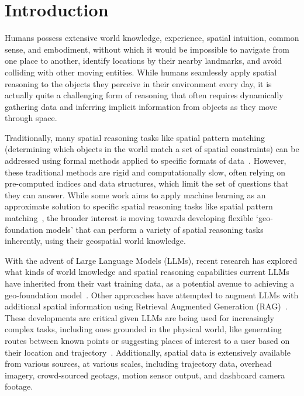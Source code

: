 \section{Introduction}
\label{section:introduction}

Humans possess extensive world knowledge, experience, spatial intuition, common sense, and embodiment, without which it would be impossible to navigate from one place to another, identify locations by their nearby landmarks, and avoid colliding with other moving entities.
While humans seamlessly apply spatial reasoning to the objects they perceive in their environment every day, it is actually quite a challenging form of reasoning that often requires dynamically gathering data and inferring implicit information from objects as they move through space.

Traditionally, many spatial reasoning tasks like spatial pattern matching (determining which objects in the world match a set of spatial constraints) can be addressed using formal methods applied to specific formats of data~\cite{Papadias1998, Schwering2014, Duckham2023,Folkers2000, Chen2019, Fang2019, Minervino2023, Osul2023, Osul2023b}.
However, these traditional methods are rigid and computationally slow, often relying on pre-computed indices and data structures, which limit the set of questions that they can answer.
While some work aims to apply machine learning as an approximate solution to specific spatial reasoning tasks like spatial pattern matching~\cite{Schneider2024, Schneider2024b}, the broader interest is moving towards developing flexible `geo-foundation models' that can perform a variety of spatial reasoning tasks inherently, using their geospatial world knowledge.

With the advent of Large Language Models (LLMs), recent research has explored what kinds of world knowledge and spatial reasoning capabilities current LLMs have inherited from their vast training data, as a potential avenue to achieving a geo-foundation model~\cite{Mai2024, Bhandari2023, Qi2023, Xie2023translating, Mooney2023,Cohn2023,Bang2023}.
Other approaches have attempted to augment LLMs with additional spatial information using Retrieval Augmented Generation (RAG)~\cite{Yu2025,Schneider2025b}.
These developments are critical given LLMs are being used for increasingly complex tasks, including ones grounded in the physical world, like generating routes between known points or suggesting places of interest to a user based on their location and trajectory~\cite{Schneider2025,Yu2025}.
Additionally, spatial data is extensively available from various sources, at various scales, including trajectory data, overhead imagery, crowd-sourced geotags, motion sensor output, and dashboard camera footage.

